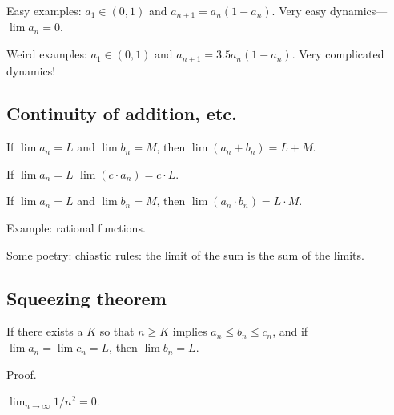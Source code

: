 \documentclass[12pt]{article}
\begin{document}
Easy examples: $a_1 \in (0,1)$ and $a_{n+1} = a_n (1-a_n)$.  Very
easy dynamics---$\lim a_n = 0$.

Weird examples: $a_1 \in (0,1)$ and $a_{n+1} = 3.5 a_n (1-a_n)$.  Very
complicated dynamics!

\subsection{Continuity of addition, etc.}

If $\lim a_n = L$ and $\lim b_n = M$, then $\lim (a_n + b_n) = L + M$.

If $\lim a_n = L$ $\lim (c \cdot a_n) = c \cdot L$.

If $\lim a_n = L$ and $\lim b_n = M$, then $\lim (a_n \cdot b_n) = L \cdot M$.

Example: rational functions.

Some poetry: chiastic rules: the limit of the sum is the sum of the
limits.

\subsection{Squeezing theorem}

If there exists a $K$ so that $n \geq K$ implies $a_n \leq b_n \leq
c_n$, and if $\lim a_n = \lim c_n = L$, then $\lim b_n = L$.

Proof.

$\lim_{n \to \infty} 1/n^2 = 0$.
\end{document}
